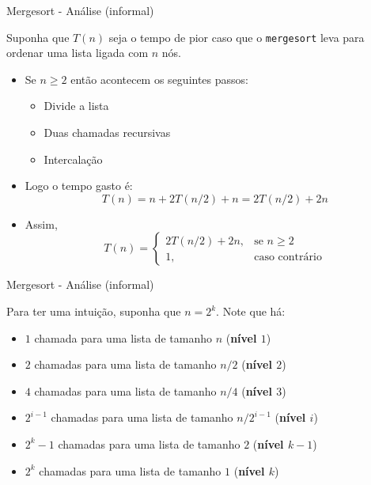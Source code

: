 \documentclass{beamer}
\newcommand{\cod}[1]{\texttt{#1}}
\begin{document}
\begin{frame}[fragile]{Mergesort - Análise (informal)}

    Suponha que $T(n)$ seja o tempo de pior caso que o \cod{mergesort} leva para ordenar uma lista ligada com $n$ nós.

    \begin{itemize}
        \item Se $n \ge 2$ então acontecem os seguintes passos:
        \begin{itemize}
            \item Divide a lista
            \item Duas chamadas recursivas
            \item Intercalação
        \end{itemize}

        \item Logo o tempo gasto é:
        \[T(n) = n + 2T(n/2) + n = 2T(n/2) + 2n \]

        \item Assim,
        \[
            T (n) =
            \begin{cases}
                2T (n/2) + 2n, & \text{se } n \geq 2\\
                1,             & \text{caso contrário}

            \end{cases}
        \]
    \end{itemize}
\end{frame}

\begin{frame}[fragile]{Mergesort - Análise (informal)}

    Para ter uma intuição, suponha que $n = 2^k$. Note que há:
    \begin{itemize}
        \item $1$ chamada para uma lista de tamanho $n$ (\textbf{nível $1$})
        \item $2$ chamadas para uma lista de tamanho $n/2$ (\textbf{nível $2$})
        \item $4$ chamadas para uma lista de tamanho $n/4$ (\textbf{nível $3$})
        \item $2^{i-1}$ chamadas para uma lista de tamanho $n/2^{i-1}$ (\textbf{nível $i$})
        \item $2^k-1$ chamadas para uma lista de tamanho $2$ (\textbf{nível $k - 1$})
        \item $2^k$ chamadas para uma lista de tamanho $1$ (\textbf{nível $k$})
    \end{itemize}

\end{frame}
\end{document}
